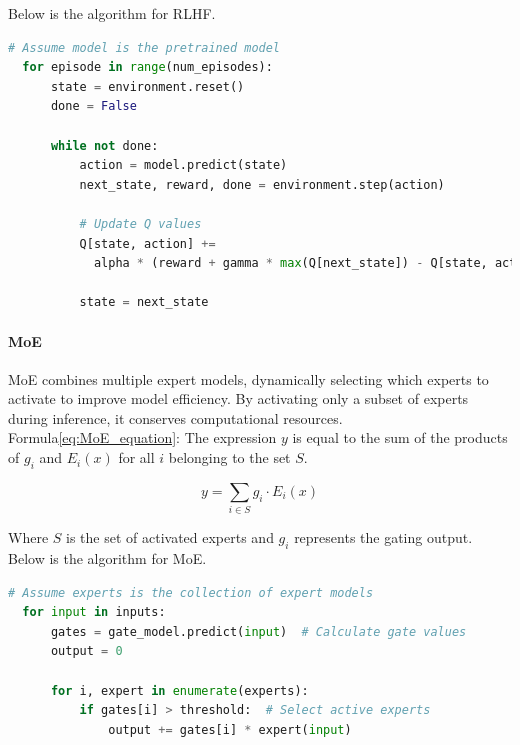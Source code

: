 \documentclass[usenatbib]{tjaa}
\begin{document}
Below is the algorithm for RLHF.

\begin{lstlisting}[language=Python]
  # Assume model is the pretrained model
  for episode in range(num_episodes):
      state = environment.reset()
      done = False
      
      while not done:
          action = model.predict(state)
          next_state, reward, done = environment.step(action)
          
          # Update Q values
          Q[state, action] += 
            alpha * (reward + gamma * max(Q[next_state]) - Q[state, action])
          
          state = next_state
\end{lstlisting}

\paragraph{MoE}
MoE combines multiple expert models, dynamically selecting which experts
to activate to improve model efficiency. By activating only a subset of
experts during inference, it conserves computational resources\citep{DBLP:journals/corr/ShazeerMMDLHD17}.
Formula\ref{eq:MoE_equation}:
The expression $y$ is equal to the sum of the products of $g_i$ and $E_i(x)$ for all $i$ belonging to the set $S$.

\begin{equation}
  y = \sum_{i \in S} g_i \cdot E_i(x)
  \label{eq:MoE_equation} %
\end{equation}

Where $S$ is the set of activated experts and $g_i$ represents the gating output.
Below is the algorithm for MoE.

\begin{lstlisting}[language=Python]
  # Assume experts is the collection of expert models
  for input in inputs:
      gates = gate_model.predict(input)  # Calculate gate values
      output = 0
      
      for i, expert in enumerate(experts):
          if gates[i] > threshold:  # Select active experts
              output += gates[i] * expert(input)
\end{lstlisting}


\end{document}
